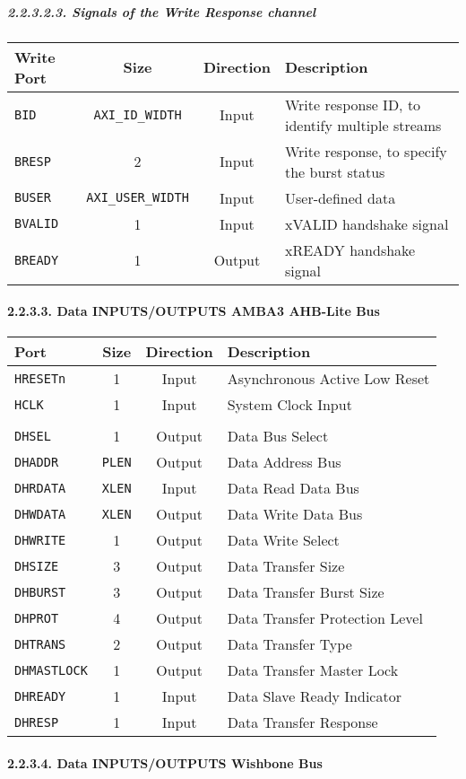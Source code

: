 \documentclass[]{article}
\let\oldparagraph\paragraph
\renewcommand{\paragraph}[1]{\oldparagraph{#1}\mbox{}}
\let\oldsubparagraph\subparagraph
\renewcommand{\subparagraph}[1]{\oldsubparagraph{#1}\mbox{}}
\begin{document}
\hypertarget{signals-of-the-write-response-channel-1}{%
\subparagraph{2.2.3.2.3. Signals of the Write Response
channel}\label{signals-of-the-write-response-channel-1}}

\begin{longtable}[]{@{}lccl@{}}
\toprule
Write Port & Size & Direction & Description\tabularnewline
\midrule
\endhead
\texttt{BID} & \texttt{AXI\_ID\_WIDTH} & Input & Write response ID, to
identify multiple streams\tabularnewline
\texttt{BRESP} & 2 & Input & Write response, to specify the burst
status\tabularnewline
\texttt{BUSER} & \texttt{AXI\_USER\_WIDTH} & Input & User-defined
data\tabularnewline
\texttt{BVALID} & 1 & Input & xVALID handshake signal\tabularnewline
\texttt{BREADY} & 1 & Output & xREADY handshake signal\tabularnewline
\bottomrule
\end{longtable}

\hypertarget{data-inputsoutputs-amba3-ahb-lite-bus}{%
\paragraph{2.2.3.3. Data INPUTS/OUTPUTS AMBA3 AHB-Lite
Bus}\label{data-inputsoutputs-amba3-ahb-lite-bus}}

\begin{longtable}[]{@{}lccl@{}}
\toprule
Port & Size & Direction & Description\tabularnewline
\midrule
\endhead
\texttt{HRESETn} & 1 & Input & Asynchronous Active Low
Reset\tabularnewline
\texttt{HCLK} & 1 & Input & System Clock Input\tabularnewline
& & &\tabularnewline
\texttt{DHSEL} & 1 & Output & Data Bus Select\tabularnewline
\texttt{DHADDR} & \texttt{PLEN} & Output & Data Address
Bus\tabularnewline
\texttt{DHRDATA} & \texttt{XLEN} & Input & Data Read Data
Bus\tabularnewline
\texttt{DHWDATA} & \texttt{XLEN} & Output & Data Write Data
Bus\tabularnewline
\texttt{DHWRITE} & 1 & Output & Data Write Select\tabularnewline
\texttt{DHSIZE} & 3 & Output & Data Transfer Size\tabularnewline
\texttt{DHBURST} & 3 & Output & Data Transfer Burst Size\tabularnewline
\texttt{DHPROT} & 4 & Output & Data Transfer Protection
Level\tabularnewline
\texttt{DHTRANS} & 2 & Output & Data Transfer Type\tabularnewline
\texttt{DHMASTLOCK} & 1 & Output & Data Transfer Master
Lock\tabularnewline
\texttt{DHREADY} & 1 & Input & Data Slave Ready Indicator\tabularnewline
\texttt{DHRESP} & 1 & Input & Data Transfer Response\tabularnewline
\bottomrule
\end{longtable}

\hypertarget{data-inputsoutputs-wishbone-bus}{%
\paragraph{2.2.3.4. Data INPUTS/OUTPUTS Wishbone
Bus}\label{data-inputsoutputs-wishbone-bus}}
\end{document}
